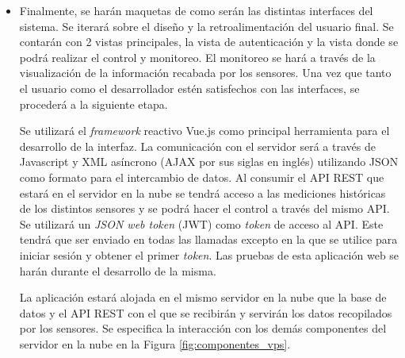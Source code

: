 \begin{itemize}
	\item Finalmente, se harán maquetas de como serán las distintas interfaces del sistema. Se iterará sobre el diseño y la retroalimentación del usuario final. Se contarán con 2 vistas principales, la vista de autenticación y la vista donde se podrá realizar el control y monitoreo. El monitoreo se hará a través de la visualización de la información recabada por los sensores. Una vez que tanto el usuario como el desarrollador estén satisfechos con las interfaces, se procederá a la siguiente etapa.

	Se utilizará el \textit{framework} reactivo Vue.js como principal herramienta para el desarrollo de la interfaz. La comunicación con el servidor será a través de Javascript y XML asíncrono (AJAX por sus siglas en inglés) utilizando JSON como formato para el intercambio de datos. Al consumir el API REST que estará en el servidor en la nube se tendrá acceso a las mediciones históricas de los distintos sensores y se podrá hacer el control a través del mismo API. Se utilizará un \textit{JSON web token} (JWT) como \textit{token} de acceso al API. Este tendrá que ser enviado en todas las llamadas excepto en la que se utilice para iniciar sesión y obtener el primer \textit{token}. Las pruebas de esta aplicación web se harán durante el desarrollo de la misma.

	La aplicación estará alojada en el mismo servidor en la nube que la base de datos y el API REST con el que se recibirán y servirán los datos recopilados por los sensores. Se especifica la interacción con los demás componentes del servidor en la nube en la Figura \ref{fig:componentes_vps}.
\end{itemize}





